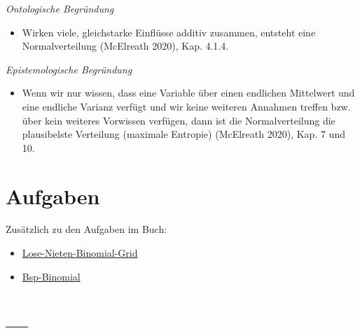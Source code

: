 \documentclass[
  a4paper,
  DIV=11]{scrreprt}
\providecommand{\tightlist}{%
  \setlength{\itemsep}{0pt}\setlength{\parskip}{0pt}}\usepackage{longtable,booktabs,array}
\theoremstyle{definition}
\theoremstyle{remark}
\begin{document}
\begin{tcolorbox}[enhanced jigsaw, left=2mm, colframe=quarto-callout-note-color-frame, opacityback=0, arc=.35mm, rightrule=.15mm, breakable, toptitle=1mm, colbacktitle=quarto-callout-note-color!10!white, colback=white, coltitle=black, bottomrule=.15mm, titlerule=0mm, opacitybacktitle=0.6, bottomtitle=1mm, title=\textcolor{quarto-callout-note-color}{\faInfo}\hspace{0.5em}{Hinweis}, toprule=.15mm, leftrule=.75mm]

\emph{Ontologische Begründung}

\begin{itemize}
\tightlist
\item
  Wirken viele, gleichstarke Einflüsse additiv zusammen, entsteht eine
  Normalverteilung (McElreath 2020), Kap. 4.1.4.
\end{itemize}

\emph{Epistemologische Begründung}

\begin{itemize}
\tightlist
\item
  Wenn wir nur wissen, dass eine Variable über einen endlichen
  Mittelwert und eine endliche Varianz verfügt und wir keine weiteren
  Annahmen treffen bzw. über kein weiteres Vorwissen verfügen, dann ist
  die Normalverteilung die plausibelste Verteilung (maximale Entropie)
  (McElreath 2020), Kap. 7 und 10.
\end{itemize}

\end{tcolorbox}

\hypertarget{aufgaben-2}{%
\section{Aufgaben}\label{aufgaben-2}}

Zusätzlich zu den Aufgaben im Buch:

\begin{itemize}
\tightlist
\item
  \href{https://datenwerk.netlify.app/posts/lose-nieten-binomial-grid/lose-nieten-binomial-grid}{Lose-Nieten-Binomial-Grid}
\item
  \href{https://datenwerk.netlify.app/posts/bsp-binomial/bsp-binomial}{Bsp-Binomial}
\end{itemize}

\hypertarget{section-3}{%
\section{---}\label{section-3}}
\end{document}
